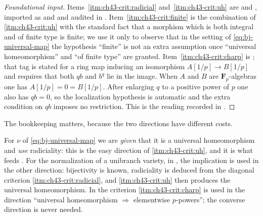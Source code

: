 \begin{proof}[Foundational input]
Items~\cref{itm:ch43-crit:radicial} and~\cref{itm:ch43-crit:uh} are
\cite[\href{https://stacks.math.columbia.edu/tag/01S4}{Tag 01S4}]
{stacks-project} and
\cite[\href{https://stacks.math.columbia.edu/tag/04DF}{Tag 04DF}]
{stacks-project}, imported as
 and
 and audited in
.
Item~\cref{itm:ch43-crit:finite} is the combination of
\cref{itm:ch43-crit:uh} with the standard fact that a morphism which is
both integral and of finite type is finite; we use it only to observe that
in the setting of \eqref{eq:bj-universal-map} the hypothesis ``finite'' is
not an extra assumption once ``universal homeomorphism'' and ``of finite
type'' are granted.
Item~\cref{itm:ch43-crit:charp} is
\cite[\href{https://stacks.math.columbia.edu/tag/0CNF}{Tag 0CNF}]
{stacks-project}; that tag is stated for a ring map inducing an isomorphism
$A[1/p]\to B[1/p]$ and requires that both $qb$ and $b^q$ lie in the
image.  When $A$ and $B$ are $\mathbf F_p$-algebras one has
$A[1/p]=0=B[1/p]$.  After enlarging $q$ to a positive power of
$p$ one also has $qb=0$, so the localization hypothesis is automatic
and the extra condition on $qb$ imposes no restriction.  This is the reading recorded in
.
\end{proof}

\begin{remark}
\label{rem:ch43-criteria-direction}
The bookkeeping matters, because the two directions have different costs.

For $\nu$ of \eqref{eq:bj-universal-map} we are \emph{given} that it is a
universal homeomorphism and \emph{use} radiciality: this is the easy
direction of \cref{itm:ch43-crit:uh}, and it is what feeds
.  For the normalization of a
unibranch variety, in , the
implication is used in the other direction: bijectivity is known, radiciality
is deduced from the diagonal criterion \cref{itm:ch43-crit:radicial}, and
\cref{itm:ch43-crit:uh} then produces the universal homeomorphism.  In
 the criterion \cref{itm:ch43-crit:charp} is used
in the direction ``universal homeomorphism $\Rightarrow$ elementwise
$p$-powers''; the converse direction is never needed.
\end{remark}

